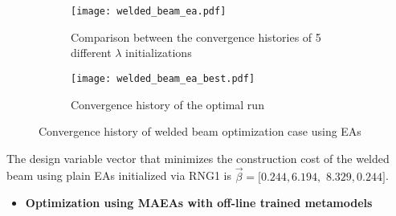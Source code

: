 \begin{table}[h!]
\centering
\caption{Optimization of welded beam design using EAs}
\label{table:EAs_welded_beam}
\end{table}

\begin{figure}[h!]
\centering
	\begin{subfigure}[b]{0.49\textwidth}
    \centering
    \caption{Comparison between the convergence histories of 5 
    different $λ$ initializations}
    \texttt{[image: welded\_beam\_ea.pdf]}    
    \end{subfigure}
    \hfill
    \begin{subfigure}[b]{0.49\textwidth}
    \centering
    \caption{Convergence history of the optimal run}
    \texttt{[image: welded\_beam\_ea\_best.pdf]}    
    \end{subfigure}  
\caption{Convergence history of welded beam optimization case 
using EAs} 
\label{fig:EAs_welded_beam}
\end{figure}

The design variable vector that minimizes the construction
cost of the welded beam using plain EAs initialized via RNG1 is 
$\vec{β} = [0.244, 6.194,$ $8.329, 0.244]$. 

\newpage


\begin{itemize}
\item \textbf{Optimization using MAEAs with off-line trained 
metamodels}
\end{itemize}

